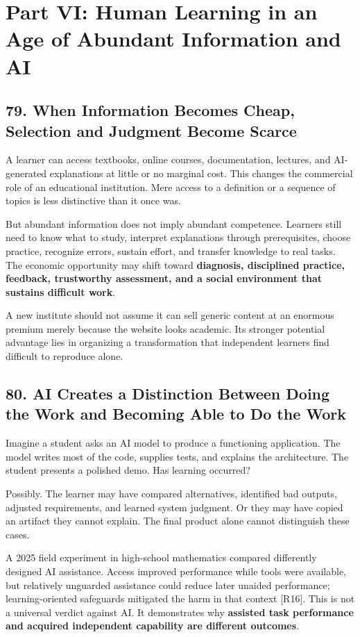 \section*{Part VI: Human Learning in an Age of Abundant Information and AI}

\subsection*{79. When Information Becomes Cheap, Selection and Judgment Become Scarce}

A learner can access textbooks, online courses, documentation, lectures, and AI-generated explanations at little or no marginal cost. This changes the commercial role of an educational institution. Mere access to a definition or a sequence of topics is less distinctive than it once was.

But abundant information does not imply abundant competence. Learners still need to know what to study, interpret explanations through prerequisites, choose practice, recognize errors, sustain effort, and transfer knowledge to real tasks. The economic opportunity may shift toward \textbf{diagnosis, disciplined practice, feedback, trustworthy assessment, and a social environment that sustains difficult work}.

A new institute should not assume it can sell generic content at an enormous premium merely because the website looks academic. Its stronger potential advantage lies in organizing a transformation that independent learners find difficult to reproduce alone.

\subsection*{80. AI Creates a Distinction Between Doing the Work and Becoming Able to Do the Work}

Imagine a student asks an AI model to produce a functioning application. The model writes most of the code, supplies tests, and explains the architecture. The student presents a polished demo. Has learning occurred?

Possibly. The learner may have compared alternatives, identified bad outputs, adjusted requirements, and learned system judgment. Or they may have copied an artifact they cannot explain. The final product alone cannot distinguish these cases.

A 2025 field experiment in high-school mathematics compared differently designed AI assistance. Access improved performance while tools were available, but relatively unguarded assistance could reduce later unaided performance; learning-oriented safeguards mitigated the harm in that context [R16]. This is not a universal verdict against AI. It demonstrates why \textbf{assisted task performance and acquired independent capability are different outcomes}.


